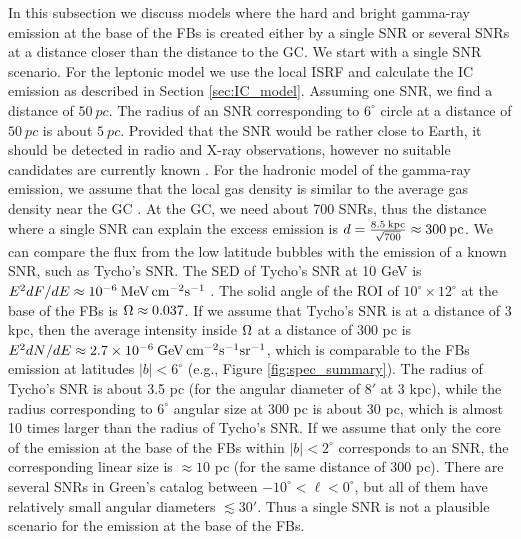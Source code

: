 In this subsection we discuss models where the hard and bright gamma-ray emission at the base of the FBs is created either by a single SNR
or several SNRs at a distance closer than the distance to the GC.
We start with a single SNR scenario.
For the leptonic model we use the local ISRF and calculate the IC emission as described in Section \ref{sec:IC_model}.
Assuming one SNR, we find a distance of $\SI{50}{pc}$.
The radius of an SNR corresponding to $6^\circ$ circle at a distance of $\SI{50}{pc}$ is about $\SI{5}{pc}$.
Provided that the SNR would be rather close to Earth, it should be detected in radio and X-ray observations,
however no suitable candidates are currently known \citep{2014BASI...42...47G, 2017Green}.
For the hadronic model of the gamma-ray emission, we assume that 
the local gas density is similar to the average gas density near the GC \citep{2017ApJ...834...57M}.
At the GC, we need about 700 SNRs, thus the distance where a single SNR can explain the excess emission
is $d = \frac{8.5\: {\rm kpc}}{\sqrt{700}} \approx 300\:{\rm pc}$.
We can compare the flux from the low latitude bubbles with the emission of a known SNR, such as Tycho's SNR.
The SED of Tycho's SNR at 10 GeV is $E^2 {dF}/{dE} \approx 10^{-6}\: {\rm MeV\, cm^{-2} s^{-1}}$ \citep{2017ApJ...836...23A}.
The solid angle of the ROI of $10^\circ \times 12^\circ$ at the base of the FBs is $\Omega \approx 0.037$.
If we assume that Tycho's SNR is at a distance of 3 kpc, then the average intensity inside $\Omega$ at a distance of 300 pc
is $E^2 {dN}/{dE} \approx 2.7 \times 10^{-6}\: {\rm GeV\, cm^{-2} s^{-1} sr^{-1}}$, which is comparable to the 
FBs emission at latitudes $|b| < 6^\circ$ (e.g., Figure \ref{fig:spec_summary}).
The radius of Tycho's SNR is about 3.5 pc (for the angular diameter of $8'$ at 3 kpc),
while the radius corresponding to $6^\circ$ angular size at 300 pc is about 30 pc, which is almost 10 times larger than the radius of Tycho's SNR.
If we assume that only the core of the emission at the base of the FBs within $|b| < 2^\circ$ corresponds to an SNR,
the corresponding linear size is $\approx 10$ pc (for the same distance of 300 pc).
There are several SNRs in Green's catalog \citep{2014BASI...42...47G, 2017Green} between $-10^\circ < \ell < 0^\circ$,
but all of them have relatively small angular diameters $ \lesssim 30'$.
Thus a single SNR is not a plausible scenario for the emission at the base of the FBs.

